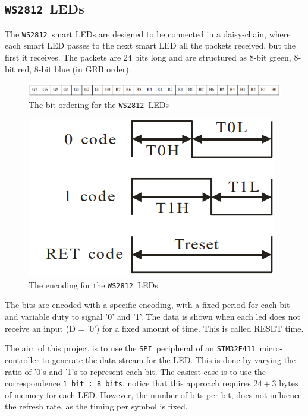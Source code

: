 \documentclass[10pt,a4]{article}
\newcommand{\stm}{\texttt{STM32F411 }}
\newcommand{\ws}{\texttt{WS2812 }}
\newcommand{\spi}{\texttt{SPI }}
\begin{document}
\subsection{\ws LEDs}
The \ws smart LEDs are designed to be connected in a daisy-chain, where each smart LED passes to the next smart LED all the packets received, but the first it receives.
The packets are 24 bits long and are structured as 8-bit green, 8-bit red, 8-bit blue (in GRB order).

\begin{figure}[H]
\centering
\includegraphics[width=\linewidth]{grb.png}
\caption{\label{fig:grb}The bit ordering for the \ws LEDs}
\end{figure}
 

\begin{figure}
\centering
\includegraphics[width=\linewidth]{encoding.png}
\caption{\label{fig:encoding}The encoding for the \ws LEDs}
\end{figure}

The bits are encoded with a specific encoding, with a fixed period for each bit and variable duty to signal '0' and '1'.
The data is shown when each led does not receive an input (D = '0') for a fixed amount of time. This is called RESET time.

The aim of this project is to use the \spi peripheral of an \stm micro-controller to generate the data-stream for the LED. This is done by varying the ratio of '0's and '1's  to represent each bit.
The easiest case is to use the correspondence \texttt{1 bit : 8 bits}, notice that this approach requires $24+3 \text{ bytes}$ of memory for each LED. However, the number of bits-per-bit, does not influence the refresh rate, as the timing per symbol is fixed. 
\end{document}
